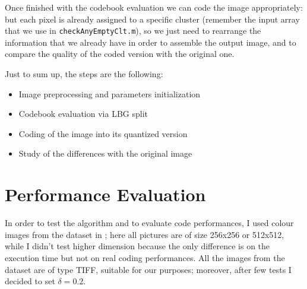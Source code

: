 \documentclass{article}
\def\code#1{\texttt{#1}}
\begin{document}
Once finished with the codebook evaluation we can code the image appropriately: but each pixel is already assigned to a specific cluster (remember the input array that we use in \code{checkAnyEmptyClt.m}), so we just need to rearrange the information that we already have in order to assemble the output image, and to compare the quality of the coded version with the original one.

Just to sum up, the steps are the following:
\begin{itemize}
	\item Image preprocessing and parameters initialization
	\item Codebook evaluation via LBG split
	\item Coding of the image into its quantized version
	\item Study of the differences with the original image
\end{itemize}

\section{Performance Evaluation}
In order to test the algorithm and to evaluate code performances, I used colour images from the dataset in \cite{SIPI}; here all pictures are of size 256x256 or 512x512, while I didn't test higher dimension because the only difference is on the execution time but not on real coding performances. All the images from the dataset are of type TIFF, suitable for our purposes; moreover, after few tests I decided to set $\delta = 0.2$.
\end{document}
